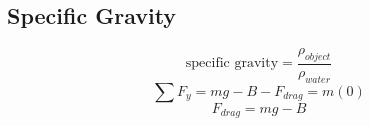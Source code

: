 \documentclass{article}
\begin{document}
\subsection{Specific Gravity}

\begin{equation}
	\text{specific gravity} = \frac{ \rho_{object} }{ \rho_{water} }
\end{equation}
\begin{equation}
	\sum F_y = mg - B - F_{drag} = m(0)
\end{equation}
\begin{equation}
	F_{drag} = mg - B
\end{equation}
\end{document}

